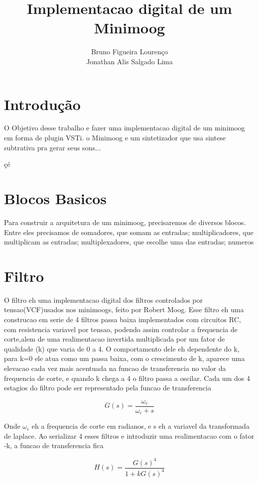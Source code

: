 \documentclass{article}
\title{Implementacao digital de um Minimoog}
\author{Bruno Figueira Lourenço \\ Jonathan Alis Salgado Lima}
\begin{document}
\maketitle

\section{Introdução}
O Objetivo desse trabalho e fazer uma implementacao digital de um minimoog em forma de plugin VSTi.
o Minimoog e um sintetizador que usa sintese subtrativa pra gerar seus sons...

çé
\section{Blocos Basicos}

Para construir a arquitetura de um minimoog, precisaremos de diversos blocos. Entre eles precisamos de somadores, que somam as entradas; multiplicadores, que multiplicam as entradas; multiplexadores, que escolhe uma das entradas; numeros 


\section{Filtro}

O filtro eh uma implementacao digital dos filtros controlados por tensao(VCF)usados nos minimoogs, feito por Robert Moog. Esse filtro eh uma construcao em serie de 4 filtros passa baixa implementados com circuitos RC, com resistencia variavel por tensao, podendo assim controlar a frequencia de corte,alem de uma realimentacao invertida multiplicada por um fator de qualidade (k) que varia de 0 a 4.
O comportamento dele eh dependente do k, para k=0 ele atua como um passa baixa, com o crescimento de k, aparece uma elevacao 
cada vez mais acentuada na funcao de transferencia no valor da frequencia de corte, e quando k chega a 4 o filtro passa a oscilar.
Cada um dos 4 estagios do filtro pode ser representado pela funcao de transferencia

\begin{equation}\label{eq:(1)}
G(s) = \frac{\omega_c}{\omega_c+s}  
\end{equation}

Onde $\omega_c$ eh a frequencia de corte em radianos, e s eh a variavel da transformada de laplace.
Ao serializar 4 esses filtros e introduzir uma realimentacao com o fator -k, a funcao de transferencia fica

\begin{equation}\label{eq:(2)}
 H(s) = \frac{G(s)^4}{1+k G(s)^4} 
\end{equation}
\end{document}
